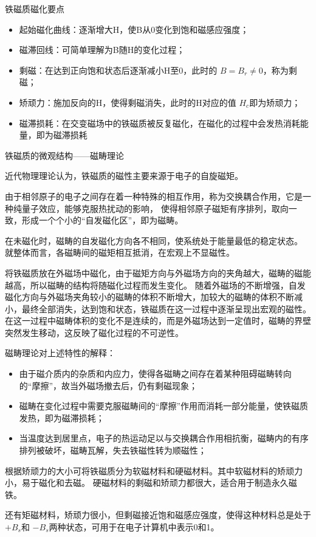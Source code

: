 {\heiti 铁磁质磁化要点}
\begin{itemize}
  \item 起始磁化曲线：逐渐增大H，使B从0变化到饱和磁感应强度；
  \item 磁滞回线：可简单理解为B随H的变化过程；
  \item 剩磁：在达到正向饱和状态后逐渐减小H至0，此时的 $B=B_r\neq 0$，称为剩磁；
  \item 矫顽力：施加反向的H，使得剩磁消失，此时的H对应的值 $H_c$即为矫顽力；
  \item 磁滞损耗：在交变磁场中的铁磁质被反复磁化，在磁化的过程中会发热消耗能量，即为磁滞损耗
\end{itemize}

{\heiti 铁磁质的微观结构——磁畴理论}

近代物理理论认为，铁磁质的磁性主要来源于电子的自旋磁矩。

由于相邻原子的电子之间存在着一种特殊的相互作用，称为交换耦合作用，它是一种纯量子效应，能够克服热扰动的影响，
使得相邻原子磁矩有序排列，取向一致，形成一个个小的“自发磁化区”，即为{\heiti 磁畴}。

在未磁化时，磁畴的自发磁化方向各不相同，使系统处于能量最低的稳定状态。
就整体而言，各磁畴间的磁矩相互抵消，在宏观上不显磁性。

将铁磁质放在外磁场中磁化，由于磁矩方向与外磁场方向的夹角越大，磁畴的磁能越高，所以磁畴的结构将随磁化过程而发生变化。
随着外磁场的不断增强，自发磁化方向与外磁场夹角较小的磁畴的体积不断增大，加较大的磁畴的体积不断减小，最终全部消失，达到饱和状态，铁磁质在这一过程中逐渐呈现出宏观的磁性。
在这一过程中磁畴体积的变化不是连续的，而是外磁场达到一定值时，磁畴的界壁突然发生移动，这反映了磁化过程的不可逆性。

磁畴理论对上述特性的解释：
\begin{itemize}
  \item 由于磁介质内的杂质和内应力，使得各磁畴之间存在着某种阻碍磁畴转向的“摩擦”，故当外磁场撤去后，仍有剩磁现象；
  \item 磁畴在变化过程中需要克服磁畴间的“摩擦”作用而消耗一部分能量，使铁磁质发热，即为磁滞损耗；
  \item 当温度达到居里点，电子的热运动足以与交换耦合作用相抗衡，磁畴内的有序排列被破坏，磁畴瓦解，失去铁磁性转为顺磁性；
\end{itemize}

根据矫顽力的大小可将铁磁质分为软磁材料和硬磁材料。其中软磁材料的矫顽力小，易于磁化和去磁。
硬磁材料的剩磁和矫顽力都很大，适合用于制造永久磁铁。

还有矩磁材料，矫顽力很小，但剩磁接近饱和磁感应强度，使得这种材料总是处于 $+B_s$和 $-B_s$两种状态，可用于在电子计算机中表示0和1。